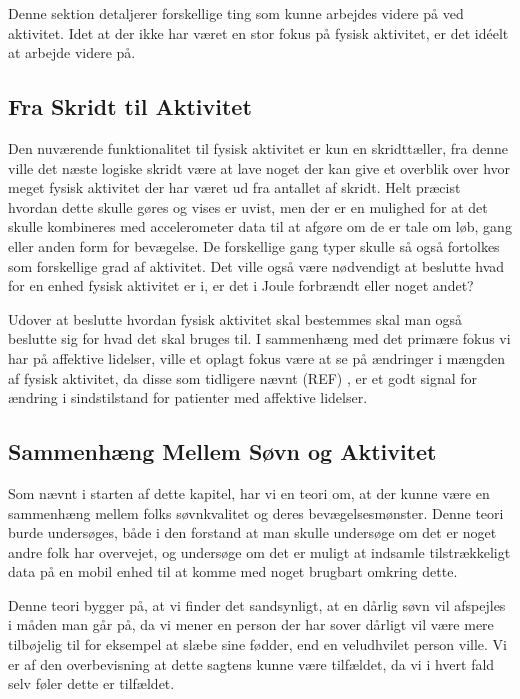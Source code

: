 Denne sektion detaljerer forskellige ting som kunne arbejdes videre på ved aktivitet.
Idet at der ikke har været en stor fokus på fysisk aktivitet, er det idéelt at arbejde videre på.

\subsection{Fra Skridt til Aktivitet}
Den nuværende funktionalitet til fysisk aktivitet er kun en skridttæller, fra denne ville det næste logiske skridt være at lave noget der kan give et overblik over hvor meget fysisk aktivitet der har været ud fra antallet af skridt.
Helt præcist hvordan dette skulle gøres og vises er uvist, men der er en mulighed for at det skulle kombineres med accelerometer data til at afgøre om de er tale om løb, gang eller anden form for bevægelse.
De forskellige gang typer skulle så også fortolkes som forskellige grad af aktivitet. 
Det ville også være nødvendigt at beslutte hvad for en enhed fysisk aktivitet er i, er det i Joule forbrændt eller noget andet?

Udover at beslutte hvordan fysisk aktivitet skal bestemmes skal man også beslutte sig for hvad det skal bruges til.
I sammenhæng med det primære fokus vi har på affektive lidelser, ville et oplagt fokus være at se på ændringer i mængden af fysisk aktivitet, da disse som tidligere nævnt (REF) , er et godt signal for ændring i sindstilstand for patienter med affektive lidelser.

\subsection{Sammenhæng Mellem Søvn og Aktivitet}
Som nævnt i starten af dette kapitel, har vi en teori om, at der kunne være en sammenhæng mellem folks søvnkvalitet og deres bevægelsesmønster.
Denne teori burde undersøges, både i den forstand at man skulle undersøge om det er noget andre folk har overvejet, og undersøge om det er muligt at indsamle tilstrækkeligt data på en mobil enhed til at komme med noget brugbart omkring dette.

Denne teori bygger på, at vi finder det sandsynligt, at en dårlig søvn vil afspejles i måden man går på, da vi mener en person der har sover dårligt vil være mere tilbøjelig til for eksempel at slæbe sine fødder, end en veludhvilet person ville.
Vi er af den overbevisning at dette sagtens kunne være tilfældet, da vi i hvert fald selv føler dette er tilfældet.

